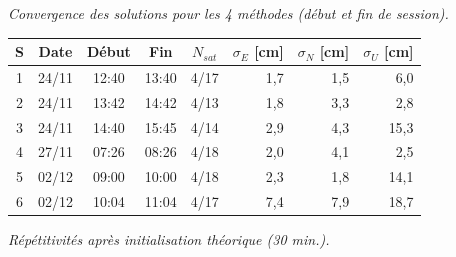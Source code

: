 \documentclass[portrait,final,a0paper,fontscale=0.3]{baposter}
\begin{document}
\begin{poster}
{	\vspace{-1mm}
	{\footnotesize\it Convergence des solutions pour les 4 méthodes (début et fin de session).}

	\vspace{-2mm}
	\begin{center}
	\begin{tabular}{cccccrrr}
		\hline
		S & Date  & Début & Fin   & $N_{sat}$ & $\sigma_E$ [cm] & $\sigma_N$ [cm] & $\sigma_U$ [cm]\\
		\hline
		1 & 24/11 & 12:40 & 13:40 & 4/17      & 1,7             & 1,5             &  6,0            \\
		2 & 24/11 & 13:42 & 14:42 & 4/13      & 1,8             & 3,3             &  2,8            \\
		3 & 24/11 & 14:40 & 15:45 & 4/14      & 2,9             & 4,3             & 15,3            \\
		4 & 27/11 & 07:26 & 08:26 & 4/18      & 2,0             & 4,1             &  2,5            \\
		5 & 02/12 & 09:00 & 10:00 & 4/18      & 2,3             & 1,8             & 14,1            \\
		6 & 02/12 & 10:04 & 11:04 & 4/17      & 7,4             & 7,9             & 18,7            \\
		\hline
	\end{tabular}
	
	\vspace{2mm}
	{\footnotesize\it Répétitivités après initialisation théorique (30 min.).}
	\end{center}
}

\end{poster}
\end{document}
